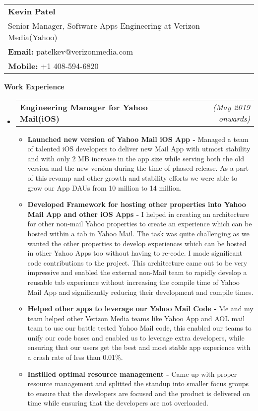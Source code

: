 \documentclass[a4paper,11pt,times]{res}
\makeatletter
\newcommand{\smalitem}[1]{\item #1 \vspace{-4pt}}
\newcommand{\resheading}[1]{{\large \colorbox{mygrey}{\begin{minipage}{\textwidth}{\textbf{#1 \vphantom{p\^{E}}}}\end{minipage}}\vspace{4pt}}}
\newcommand{\mysubheading}[2]{
\begin{tabular*}{172mm}{l@{\extracolsep{\fill}}r}
		\textbf{#1} & \textit{#2} \\
\end{tabular*}\vspace{-1pt}}
\makeatother
\begin{document}
\vspace{-2pt}
\begin{tabular*}{160mm}{l}
\textbf{Kevin Patel} \\
Senior Manager, Software Apps Engineering at Verizon Media(Yahoo) \\
\textbf{Email:} patelkev@verizonmedia.com \\
\textbf{Mobile:} +1 408-594-6820 \\
\end{tabular*}

\resheading{Work Experience}
\begin{itemize}

\item
\mysubheading{Engineering Manager for Yahoo Mail(iOS) }{(May 2019 onwards)}
\begin{itemize}
\vspace{-2pt}
\smalitem{\textbf{Launched new version of Yahoo Mail iOS App -} Managed a team of talented iOS developers to deliver new Mail App with utmost stability and with only 2 MB increase in the app size while serving both the old version and the new version during the time of phased release. As a part of this revamp and other growth and stability efforts we were able to grow our App DAUs from 10 million to 14 million.}
\smalitem{\textbf{Developed Framework for hosting other properties into Yahoo Mail App and other iOS Apps -} I helped in creating an architecture for other non-mail Yahoo properties to create an experience which can be hosted within a tab in Yahoo Mail. The task was quite challenging as we wanted the other properties to develop experiences which can be hosted in other Yahoo Apps too without having to re-code. I made significant code contributions to the project. This architecture came out to be very impressive and enabled the external non-Mail team to rapidly develop a reusable tab experience without increasing the compile time of Yahoo Mail App and significantly reducing their development and compile times.}
\smalitem{\textbf{Helped other apps to leverage our Yahoo Mail Code -} Me and my team helped other Verizon Media teams like Yahoo App and AOL mail team to use our battle tested Yahoo Mail code, this enabled our teams to unify our code bases and enabled us to leverage extra developers, while ensuring that our users get the best and most stable app experience with a crash rate of less than 0.01\%. }
\smalitem{\textbf{Instilled optimal resource management -} Came up with proper resource management and splitted the standup into smaller focus groups to ensure that the developers are focused and the product is delivered on time while ensuring that the developers are not overloaded.}

\end{itemize}
\end{itemize}
\end{document}
